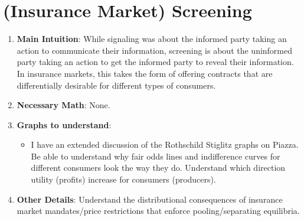 \documentclass[letter,12pt]{article}
\begin{document}
\section{(Insurance Market) Screening}
\begin{enumerate}
	\item \textbf{Main Intuition}: While signaling was about the informed party taking an action to communicate their information, screening is about the uninformed party taking an action to get the informed party to reveal their information. In insurance markets, this takes the form of offering contracts that are differentially desirable for different types of consumers.
	\item \textbf{Necessary Math}: None.
	\item \textbf{Graphs to understand}: 
	\begin{itemize}
		\item I have an extended discussion of the Rothschild Stiglitz graphs on Piazza. Be able to understand why fair odds lines and indifference curves for different consumers look the way they do. Understand which direction utility (profits) increase for consumers (producers).
	\end{itemize}
	\item \textbf{Other Details}: Understand the distributional consequences of insurance market mandates/price restrictions that enforce pooling/separating equilibria.
\end{enumerate}
\end{document}
